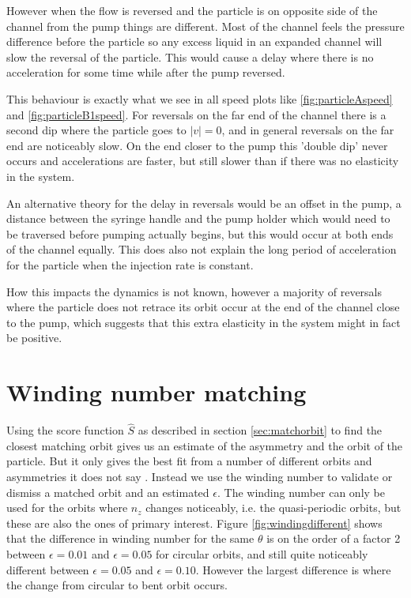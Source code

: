 However when the flow is reversed and the particle is on opposite side of the channel from the pump things are different. Most of the channel feels the pressure difference before the particle so any excess liquid in an expanded channel will slow the reversal of the particle. This would cause a delay where there is no acceleration for some time while after the pump reversed. 

This behaviour is exactly what we see in all speed plots like \ref{fig:particleAspeed} and \ref{fig:particleB1speed}. 
For reversals on the far end of the channel there is a second dip where the particle goes to $\left|v\right|=0$, and in general reversals on the far end are noticeably slow. On the end closer to the pump this 'double dip' never occurs and accelerations are faster, but still slower than if there was no elasticity in the system.

An alternative theory for the delay in reversals would be an offset in the pump, a distance between the syringe handle and the pump holder which would need to be traversed before pumping actually begins, but this would occur at both ends of the channel equally. This does also not explain the long period of acceleration for the particle when the injection rate is constant.

How this impacts the dynamics is not known, however a majority of reversals where the particle does not retrace its orbit occur at the end of the channel close to the pump, which suggests that this extra elasticity in the system might in fact be positive. 

\section{Winding number matching}
Using the score function $\hat{S}$ as described in section \ref{sec:matchorbit} to find the closest matching orbit gives us an estimate of the asymmetry and the orbit of the particle. But it only gives the best fit from a number of different orbits and asymmetries it does not say .  Instead we use the winding number to validate or dismiss a matched orbit and an estimated $\epsilon$. The winding number can only be used for the orbits where $n_z$ changes noticeably, i.e. the quasi-periodic orbits, but these are also the ones of primary interest. 
Figure \ref{fig:windingdifferent} shows that the difference in winding number for the 
same $\theta$ is on the order of a factor 2 between $\epsilon = 0.01$ and $\epsilon = 0.05$ for circular orbits, and 
still quite noticeably different between $\epsilon = 0.05$ and $\epsilon = 0.10$. However the largest difference is where the change from 
circular to bent orbit occurs. 

